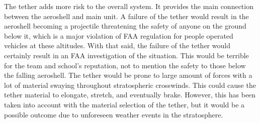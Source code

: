 \begin{table}[H]
\caption{\label{tab:tether_failure} Tether Failure Modes \& Probabilities}
\centering

\end{table}

\indent\indent The tether adds more risk to the overall system. It provides the main connection between the aeroshell and main unit. A failure of the tether would result in the aeroshell becoming a projectile threatening the safety of anyone on the ground below it, which is a major violation of FAA regulation for people operated vehicles at these altitudes. With that said, the failure of the tether would certainly result in an FAA investigation of the situation. This would be terrible for the team and school's reputation, not to mention the safety to those below the falling aeroshell. The tether would be prone to large amount of forces with a lot of material swaying throughout stratospheric crosswinds. This could cause the tether material to elongate, stretch, and eventually brake. However, this has been taken into account with the material selection of the tether, but it would be a possible outcome due to unforeseen weather events in the stratosphere.

